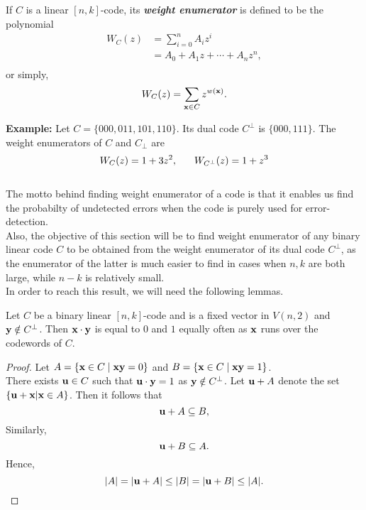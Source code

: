 \documentclass[../main.tex]{subfiles}
\begin{document}
\begin{defn}
	If $C$ is a linear $[n,k]$-code, its \textbf{\emph{weight enumerator}} is defined to be the polynomial
	\begin{align*}
		W_C(z) &= \sum_{i=0}^n A_iz^i \\
		&= A_0 + A_1z + \cdots + A_nz^n, \\
	\end{align*}
	or simply,
	\[
		W_C(z) = \sum_{\textbf{x} \in C} z^{w(\textbf{x})}.
	\]
\end{defn}

\textbf{Example:} Let $C = \{ 000,011,101,110 \}$. Its dual code $C^\perp$ is $\{ 000,111 \}$. The weight enumerators of $C$ and $C_\perp$ are
\[
	W_C(z) = 1 + 3z^2, 
	\hspace{6mm}
	W_{C^\perp}(z) = 1 + z^3 \\
\]\\
The motto behind finding weight enumerator of a code is that it enables us find the probabilty of undetected errors when the code is purely used for error-detection.\\
Also, the objective of this section will be to find weight enumerator of any binary linear code $C$ to be obtained from the weight enumerator of its dual code $C^\perp$, as the enumerator of the latter is much easier to find in cases when $n, k$ are both large, while $n-k$ is relatively small.\\
In order to reach this result, we will need the following lemmas.

\begin{lem}\label{lem_eqof_01}
	Let $C$ be a binary linear $[n,k]$-code and  is a fixed vector in $V(n,2)$ and $\textbf{y} \notin C^\perp$. Then $\textbf{x}\cdot \textbf{y}$ is equal to $0$ and $1$ equally often as $\textbf{x}$ runs over the codewords of $C$.
\end{lem}
\begin{proof}
	Let $A = \{ \textbf{x} \in C\; |\; \textbf{x}\textbf{y} = 0 \}$ and $B = \{ \textbf{x} \in C\; |\; \textbf{x}\textbf{y} = 1 \}$.\\
	There exists $\textbf{u} \in C$ such that $\textbf{u}\cdot \textbf{y} = 1$ as $\textbf{y} \notin C^\perp$. Let $\textbf{u} + A$ denote the set $\{ \textbf{u} + \textbf{x} | \textbf{x}\in A \}$. Then it follows that
	\[
		\textbf{u} + A \subseteq B,
	\]
	Similarly, 
	\[
		\textbf{u} + B \subseteq A.
	\]
	Hence,
	\[
		|A| = |\textbf{u} + A| \leq |B| = |\textbf{u} + B| \leq |A|. 
	\]
\end{proof}
\end{document}

